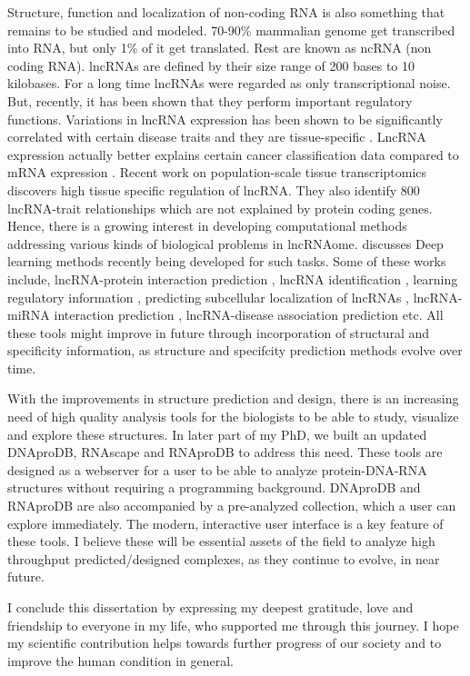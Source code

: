 Structure, function and localization of non-coding RNA is also something that remains to be studied and modeled. 70-90\% mammalian genome get transcribed into RNA, but only 1\% of it get translated. Rest are known as ncRNA (non coding RNA). lncRNAs are defined by their size range of 200 bases to 10 kilobases. For a long time lncRNAs were regarded as only transcriptional noise. But, recently, it has been shown that they perform important regulatory functions. Variations in lncRNA expression has been shown to be significantly correlated with certain disease traits \citep{wapinski2011long} and they are tissue-specific \citep{seifuddin2020lncrnakb}. LncRNA expression actually better explains certain cancer
classification data compared to mRNA expression \citep{al2019long}. Recent work on population-scale tissue transcriptomics \citep{de2021population} discovers high tissue specific regulation of lncRNA. They also identify 800 lncRNA-trait relationships which are not explained by protein coding genes. Hence, there is a growing interest in developing computational methods addressing various kinds of biological problems in lncRNAome. \citep{alam2020deep} discusses Deep learning methods recently being developed for
such tasks. Some of these works include, lncRNA-protein interaction prediction
\citep{pan2016ipminer, zhao2018bipartite, yi2018deep, zhan2019bgfe, peng2019rpiter}, lncRNA  identification \citep{baek2018lncrnanet,yang2018lncadeep, tripathi2016deeplnc},
learning regulatory information \citep{alam2019deepcnpp, alam2019deepel}, predicting subcellular localization of lncRNAs \citep{gudenas2018prediction},    lncRNA-miRNA interaction prediction \citep{huang2019predicting}, lncRNA-disease association prediction \citep{hu2019deep, xuan2019dual, al2019long, xuan2019graph} etc. All these tools might improve in future through incorporation of structural and specificity information, as structure and specifcity prediction methods evolve over time.

With the improvements in structure prediction and design, there is an increasing need of high quality analysis tools for the biologists to be able to study, visualize and explore these structures. In later part of my PhD, we built an updated DNAproDB, RNAscape \citep{Mitra2024rnascape} and RNAproDB to address this need. These tools are designed as a webserver for a user to be able to analyze protein-DNA-RNA structures without requiring a programming background. DNAproDB and RNAproDB are also accompanied by a pre-analyzed collection, which a user can explore immediately. The modern, interactive user interface is a key feature of these tools. I believe these will be essential assets of the field to analyze high throughput predicted/designed complexes, as they continue to evolve, in near future. 

I conclude this dissertation by expressing my deepest gratitude, love and friendship to everyone in my life, who supported me through this journey. I hope my scientific contribution helps towards further progress of our society and to improve the human condition in general.
